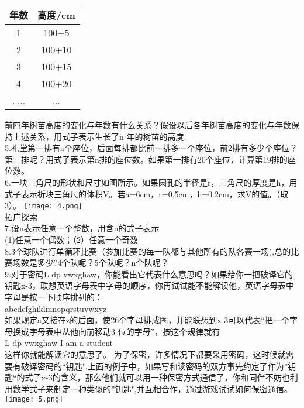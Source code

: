 \documentclass{ctexart}
\begin{document}
\begin{article}
\usepackage{graphicx}
\begin{ex}
\begin{tabular}{|c|c|}
\hline  %
年数&高度/cm\\
\hline
1&100+5\\
\hline
2&100+10\\
\hline
3&100+15\\
\hline
4&100+20\\
\hline
.....&...\\
\hline
  \end{tabular}
前四年树苗高度的变化与年数有什么关系？假设以后各年树苗高度的变化与年数保持上述关系，用式子表示生长了n 年的树苗的高度.\\
5.礼堂第一排有a个座位，后面每排都比前一排多一个座位，前2排有多少个座位？第三排呢？用式子表示第n排的座位数。如果第一排有20个座位，计算第19排的座位数。\\
6.一块三角尺的形状和尺寸如图所示。如果圆孔的半径是r，三角尺的厚度是h，用式子表示折块三角尺的体积V。若a=6cm，r=0.5cm，h=0.2cm，求V的值。（\pi 取3）。
\texttt{[image: 4.png]}\\
拓广探索\\
7.设n表示任意一个整数，用含n的式子表示\\
(1)任意一个偶数；（2）任意一个奇数\\
8.3个球队进行单循环比赛（参加比赛的每一队都与其他所有的队各赛一场),总的比赛场数是多少?4个队呢？5个队呢？n个队呢？\\
9.对于密码L dp vwxghaw，你能看出它代表什么意思吗？如果给你一把破译它的钥匙x-3，联想英语字母表中字母的顺序，你再试试能不能解读他，英语字母表中字母是按一下顺序排列的：\\
abcdefghiklmnopqrstuvwxyz\\
如果规定a又接在z的后面，使26个字母排成圈，并能联想到x-3可以代表“把一个字母换成字母表中从他向前移动3
位的字母”，按这个规律就有\\
L dp vwxghaw \rightarrow I am a student\\
这样你就能解读它的意思了。
为了保密，许多情况下都要采用密码，这时候就需要有破译密码的“钥匙".上面的例子中，如果写和读密码的双方事先约定了作为”钥匙“的式子x-3的含义，那么他们就可以用一种保密方式通信了，你和同伴不妨也利用数学式子来制定一种类似的”钥匙",并互相合作，通过游戏试试如何保密通信。
\texttt{[image: 5.png]}\\
\end{ex}
\end{article}
\end{document}
